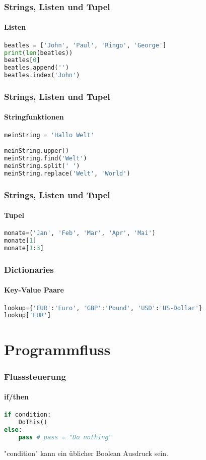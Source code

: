 \documentclass[12pt,ngerman]{beamer}
\begin{document}
\begin{frame}[fragile]
\frametitle{Strings, Listen und Tupel}
\framesubtitle{Listen}

\begin{lstlisting}[language={Python},caption={Listen}]
beatles = ['John', 'Paul', 'Ringo', 'George']
print(len(beatles))
beatles[0]
beatles.append('')
beatles.index('John')
\end{lstlisting}
\end{frame}


\begin{frame}[fragile]
\frametitle{Strings, Listen und Tupel}
\framesubtitle{Stringfunktionen}

\begin{lstlisting}[language={Python},caption={Strings}]
meinString = 'Hallo Welt'

meinString.upper()
meinString.find('Welt')
meinString.split(' ')
meinString.replace('Welt', 'World')
\end{lstlisting}
\end{frame}


\begin{frame}[fragile]
\frametitle{Strings, Listen und Tupel}
\framesubtitle{Tupel}

\begin{lstlisting}[language={Python},caption={Tupel}]
monate=('Jan', 'Feb', 'Mar', 'Apr', 'Mai')
monate[1]
monate[1:3]
\end{lstlisting}
\end{frame}


\begin{frame}[fragile]
\frametitle{Dictionaries}
\framesubtitle{Key-Value Paare}

\begin{lstlisting}[language={Python},caption={Dictionaries}]
lookup={'EUR':'Euro', 'GBP':'Pound', 'USD':'US-Dollar'}
lookup['EUR']
\end{lstlisting}
\end{frame}

\section{Programmfluss}

\begin{frame}[fragile]
\frametitle{Flusssteuerung}
\framesubtitle{if/then}

\begin{lstlisting}[language={Python},caption={if-then}]
if condition:
	DoThis()
else:
	pass # pass = "Do nothing"
\end{lstlisting}

"condition" kann ein üblicher Boolean Ausdruck sein.

\end{frame}
\end{document}
